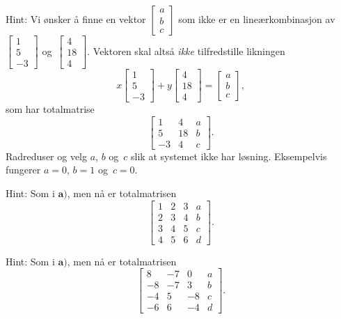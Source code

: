 \begin{losning}
\begin{punkt}
Hint: Vi ønsker å finne en vektor $\begin{bmatrix}
a\\
b\\
c
\end{bmatrix}$ som ikke er en lineærkombinasjon av 
$
\begin{bmatrix}
	1\\
	5\\
	-3
\end{bmatrix}$ og~$
\begin{bmatrix}
	4\\
	18\\
	4
\end{bmatrix}$. Vektoren skal altså \emph{ikke} tilfredstille likningen 
$$x
\begin{bmatrix}
1\\
5\\
-3
\end{bmatrix}+y
\begin{bmatrix}
4\\
18\\
4
\end{bmatrix}=
\begin{bmatrix}
a\\
b\\
c
\end{bmatrix},$$
som har totalmatrise
$$\begin{bmatrix}
1  & 4  & a\\
5  & 18 & b\\
-3 & 4  & c
\end{bmatrix}.$$ Radreduser og velg $a$, $b$ og~$c$ slik at systemet ikke har løsning. Eksempelvis fungerer $a=0$, $b=1$ og~$c=0$.
\end{punkt}
\begin{punkt}
Hint: Som i $\textbf{a)}$, men nå er totalmatrisen
$$\begin{bmatrix}
1 & 2 & 3 & a\\
2 & 3 & 4 & b\\
3 & 4 & 5 & c\\
4 & 5 & 6 & d
\end{bmatrix}.$$
\end{punkt}


\begin{punkt}
Hint: Som i $\textbf{a)}$, men nå er totalmatrisen
$$\begin{bmatrix}
8  & -7 & 0  & a\\
-8 & -7 & 3  & b\\
-4 & 5  & -8 & c\\
-6 & 6  & -4 & d
\end{bmatrix}.$$
\end{punkt}
\end{losning}


